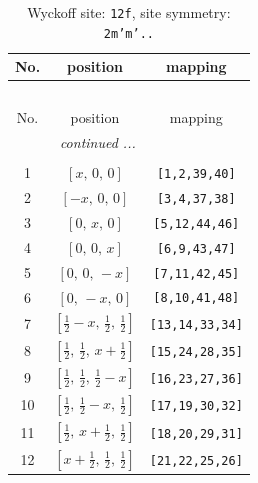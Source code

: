 \documentclass[fleqn,8pt]{jsarticle}
\begin{document}
\begin{longtable}{ccc}
\caption{Wyckoff site: {\tt 12f}, site symmetry: {\tt 2m'm'..}}
 \\
 \hline \hline
No. & position & mapping \\ \hline \endfirsthead

\multicolumn{2}{l}{\tablename\ \thetable{}} \\
 \hline \hline
No. & position & mapping \\ \hline \endhead

 \hline \hline
\multicolumn{2}{r}{\footnotesize\it continued ...} \\ \endfoot

 \hline \hline
\multicolumn{2}{r}{} \\ \endlastfoot

1 & $\left[ x,\, 0,\, 0 \right]$ & {\tt [1,2,39,40]} \\ \hline
2 & $\left[ - x,\, 0,\, 0 \right]$ & {\tt [3,4,37,38]} \\ \hline
3 & $\left[ 0,\, x,\, 0 \right]$ & {\tt [5,12,44,46]} \\ \hline
4 & $\left[ 0,\, 0,\, x \right]$ & {\tt [6,9,43,47]} \\ \hline
5 & $\left[ 0,\, 0,\, - x \right]$ & {\tt [7,11,42,45]} \\ \hline
6 & $\left[ 0,\, - x,\, 0 \right]$ & {\tt [8,10,41,48]} \\ \hline
7 & $\left[ \frac{1}{2} - x,\, \frac{1}{2},\, \frac{1}{2} \right]$ & {\tt [13,14,33,34]} \\ \hline
8 & $\left[ \frac{1}{2},\, \frac{1}{2},\, x + \frac{1}{2} \right]$ & {\tt [15,24,28,35]} \\ \hline
9 & $\left[ \frac{1}{2},\, \frac{1}{2},\, \frac{1}{2} - x \right]$ & {\tt [16,23,27,36]} \\ \hline
10 & $\left[ \frac{1}{2},\, \frac{1}{2} - x,\, \frac{1}{2} \right]$ & {\tt [17,19,30,32]} \\ \hline
11 & $\left[ \frac{1}{2},\, x + \frac{1}{2},\, \frac{1}{2} \right]$ & {\tt [18,20,29,31]} \\ \hline
12 & $\left[ x + \frac{1}{2},\, \frac{1}{2},\, \frac{1}{2} \right]$ & {\tt [21,22,25,26]} \\
\end{longtable}
\renewcommand{\arraystretch}{1.2}
\end{document}
